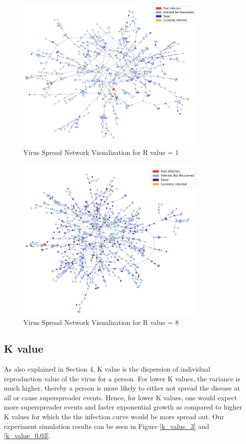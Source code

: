 \documentclass[11pt]{article}
\begin{document}
\begin{figure}[H]
    \centering
    \includegraphics[width=9.5cm]{figures/r_value_1_network.png}
    \caption{Virus Spread Network Visualization for R value = 1}
    \label{r_value_network_1}
\end{figure}

\begin{figure}[H]
    \centering
    \includegraphics[width=9.5cm]{figures/r_value_8_network.png}
    \caption{Virus Spread Network Visualization for R value = 8}
    \label{r_value_network_8}
\end{figure}

\subsection{K value}
As also explained in Section 4, K value is the dispersion of individual reproduction value of the virus for a person. For lower K values, the variance is much higher, thereby a person is more likely to either not spread the disease at all or cause superspreader events. Hence, for lower K values, one would expect more superspreader events and faster exponential growth as compared to higher K values for which the the infection curve would be more spread out. Our experiment simulation results can be seen in Figure \ref{k_value_3} and \ref{k_value_0.03}.
\end{document}
